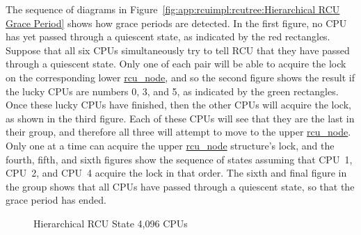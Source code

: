 The sequence of diagrams in
Figure~\ref{fig:app:rcuimpl:rcutree:Hierarchical RCU Grace Period}
shows how grace periods are detected.
In the first figure, no CPU has yet passed through a quiescent state,
as indicated by the red rectangles.
Suppose that all six CPUs simultaneously try to tell RCU that they have
passed through a quiescent state.
Only one of each pair will be able to acquire the lock on the
corresponding lower \url{rcu_node}, and so the second figure
shows the result if the lucky CPUs are numbers 0, 3, and 5, as indicated
by the green rectangles.
Once these lucky CPUs have finished, then the other CPUs will acquire
the lock, as shown in the third figure.
Each of these CPUs will see that they are the last in their group,
and therefore all three will attempt to move to the upper
\url{rcu_node}.
Only one at a time can acquire the upper \url{rcu_node} structure's
lock, and the fourth, fifth, and sixth figures show the sequence of
states assuming that CPU~1, CPU~2, and CPU~4 acquire
the lock in that order.
The sixth and final figure in the group shows that all CPUs have passed
through a quiescent state, so that the grace period has ended.

\begin{figure}[htb]
\begin{center}
\end{center}
\caption{Hierarchical RCU State 4,096 CPUs}
\label{fig:app:rcuimpl:rcutree:Hierarchical RCU State 4,096 CPUs}
\end{figure}

